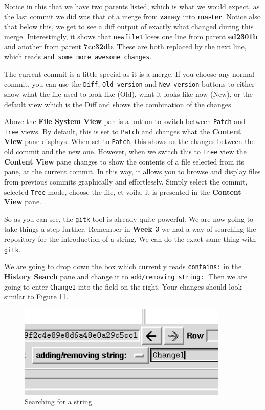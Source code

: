 Notice in this that we have two parents listed, which is what we would expect, as the last commit we did was that of a merge from \textbf{zaney} into \textbf{master}.  Notice also that below this, we get to see a diff output of exactly what changed during this merge.  Interestingly, it shows that \texttt{newfile1} loses one line from parent \textbf{ed2301b} and another from parent \textbf{7cc32db}.  These are both replaced by the next line, which reads \texttt{and some more awesome changes}.

The current commit is a little special as it is a merge.  If you choose any normal commit, you can use the \texttt{Diff}, \texttt{Old version} and \texttt{New version} buttons to either show what the file used to look like (Old), what it looks like now (New), or the default view which is the Diff and shows the combination of the changes.

Above the \textbf{File System View} pan is a button to switch between \texttt{Patch} and \texttt{Tree} views.  By default, this is set to \texttt{Patch} and changes what the \textbf{Content View} pane displays.  When set to \texttt{Patch}, this shows us the changes between the old commit and the new one.  However, when we switch this to \texttt{Tree} view the \textbf{Content View} pane changes to show the contents of a file selected from its pane, at the current commit.  In this way, it allows you to browse and display files from previous commits graphically and effortlessly.  Simply select the commit, selected \texttt{Tree} mode, choose the file, et voila, it is presented in the \textbf{Content View} pane.

So as you can see, the \texttt{gitk} tool is already quite powerful.  We are now going to take things a step further.  Remember in \textbf{Week 3} we had a way of searching the repository for the introduction of a string.  We can do the exact same thing with \texttt{gitk}.  

We are going to drop down the box which currently reads \texttt{contains:} in the \textbf{History Search} pane and change it to \texttt{add/removing string:}.  Then we are going to enter \texttt{Change1} into the field on the right.  Your changes should look similar to Figure 11.

\begin{figure}[hbt]
\centering
\includegraphics[width=10cm]{images/f-w5-d11.png}
\caption{Searching for a string}
\end{figure} 

